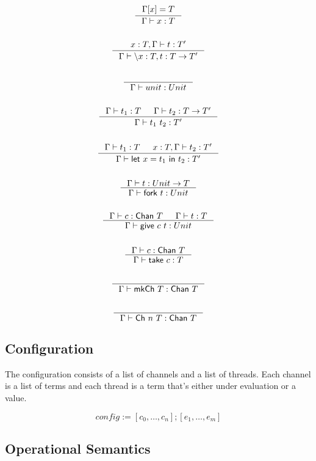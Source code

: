 \documentclass{article}
\newcommand{\sco}[1]{\textsf{#1}}
\newcommand{\lam}[3]{\backslash #1 : #2, #3}
\newcommand{\letin}[3]{\sco{let } #1 = #2 \sco{ in } #3}
\newcommand{\fork}[1]{\sco{fork }#1}
\newcommand{\give}[2]{\sco{give } #1\ #2}
\newcommand{\take}[1]{\sco{take } #1}
\newcommand{\mkch}[1]{\sco{mkCh } #1}
\newcommand{\channel}[2]{\sco{Ch }#1\ #2}
\newcommand{\Chan}[1]{\sco{Chan }#1}
\begin{document}
\begin{gather*}
    \inference{
        \Gamma[x] = T
    }{
        \Gamma |- x : T
    }\\
    \\
    \inference{
        x : T, \Gamma |- t : T'
    }{
        \Gamma |- \lam{x}{T}{t} : T -> T'
    }\\
    \\
    \inference{}{
        \Gamma |- unit : Unit
    }\\
    \\
    \inference{
        \Gamma |- t_1 : T & \Gamma |- t_2 : T -> T'
    }{
        \Gamma |- t_1\ t_2 : T'
    }\\
    \\
    \inference{
        \Gamma |- t_1 : T & x : T, \Gamma |- t_2 : T'
    }{
        \Gamma |- \letin{x}{t_1}{t_2} : T'
    }\\
    \\
    \inference{
        \Gamma |- t : Unit -> T
    }{
        \Gamma |- \fork{t} : Unit
    }\\
    \\
    \inference{
        \Gamma |- c : \Chan{T} & \Gamma |- t : T
    }{
        \Gamma |- \give{c}{t} : Unit
    }\\
    \\
    \inference{
        \Gamma |- c : \Chan{T}
    }{
        \Gamma |- \take{c} : T
    }\\
    \\
    \inference{}{
        \Gamma |- \mkch{T} : \Chan{T}
    }\\
    \\
    \inference{}{
        \Gamma |- \channel{n}{T} : \Chan{T}
    }
\end{gather*}

\subsection{Configuration}

The configuration consists of a list of channels and a list of threads. Each channel is a list of terms
and each thread is a term that's either under evaluation or a value.

    $$config := [c_0,\dots,c_n];[e_1,\dots,e_m]$$

\subsection{Operational Semantics}
\end{document}
